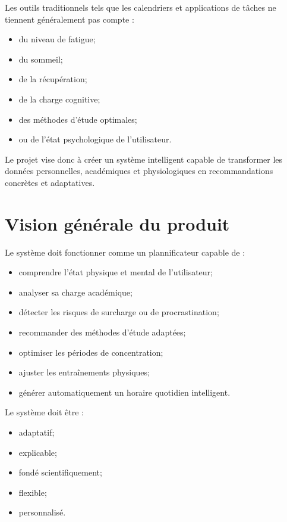 \documentclass[12pt]{article}
\begin{document}
Les outils traditionnels tels que les calendriers et applications de tâches ne tiennent généralement pas compte :
\begin{itemize}
    \item du niveau de fatigue;
    \item du sommeil;
    \item de la récupération;
    \item de la charge cognitive;
    \item des méthodes d’étude optimales;
    \item ou de l’état psychologique de l’utilisateur.
\end{itemize}

Le projet vise donc à créer un système intelligent capable de transformer les données personnelles, académiques et physiologiques en recommandations concrètes et adaptatives.

\section{Vision générale du produit}

Le système doit fonctionner comme un plannificateur capable de :
\begin{itemize}
    \item comprendre l’état physique et mental de l’utilisateur;
    \item analyser sa charge académique;
    \item détecter les risques de surcharge ou de procrastination;
    \item recommander des méthodes d’étude adaptées;
    \item optimiser les périodes de concentration;
    \item ajuster les entraînements physiques;
    \item générer automatiquement un horaire quotidien intelligent.
\end{itemize}

Le système doit être :
\begin{itemize}
    \item adaptatif;
    \item explicable;
    \item fondé scientifiquement;
    \item flexible;
    \item personnalisé.
\end{itemize}
\end{document}
